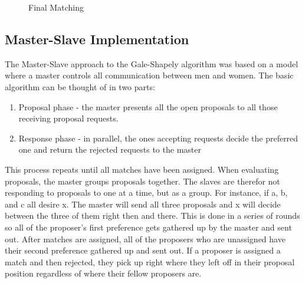 \begin{figure}[!ht]
    \centering
    \caption{Final Matching}
    \label{fig:DivideAndConquer_1}
\end{figure}




\subsection{Master-Slave Implementation}
The Master-Slave approach to the Gale-Shapely algorithm was based on a model where a master controls all communication between men and women.\cite{larsen1997parallel} The basic algorithm can be thought of in two parts:
\begin{enumerate}
    \item Proposal phase - the master presents all the open proposals to all those receiving proposal requests.
    \item Response phase - in parallel, the ones accepting requests decide the preferred one and return the rejected requests to the master
\end{enumerate}
This process repeats until all matches have been assigned. When evaluating proposals, the master groups proposals together. The slaves are therefor not responding to proposals to one at a time, but as a group. For instance, if a, b, and c all desire x. The master will send all three proposals and x will decide between the three of them right then and there. This is done in a series of rounds so all of the proposer's first preference gets gathered up by the master and sent out. After matches are assigned, all of the proposers who are unassigned have their second preference gathered up and sent out. If a proposer is assigned a match and then rejected, they pick up right where they left off in their proposal position regardless of where their fellow proposers are.


